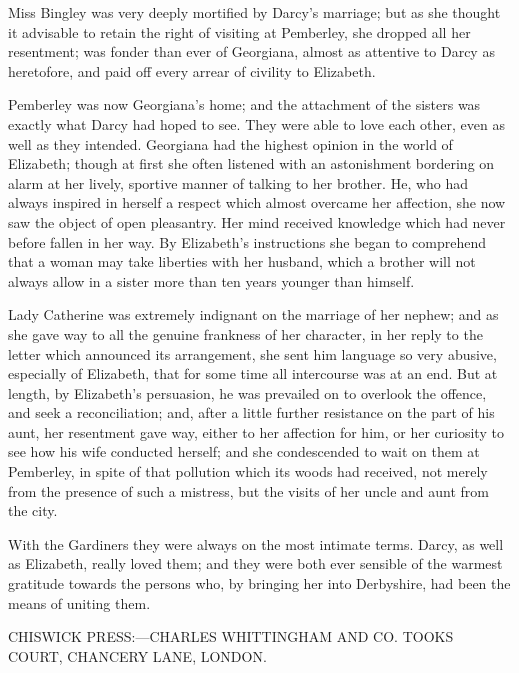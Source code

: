 \documentclass[12pt,openright]{book}
\begin{document}
Miss Bingley was very deeply mortified by Darcy’s marriage; but as she thought it advisable to retain the right of visiting at Pemberley, she dropped all her resentment; was fonder than ever of Georgiana, almost as attentive to Darcy as heretofore, and paid off every arrear of civility to Elizabeth.

Pemberley was now Georgiana’s home; and the attachment of the sisters was exactly what Darcy had hoped to see. They were able to love each other, even as well as they intended. Georgiana had the highest opinion in the world of Elizabeth; though at first she often listened with an astonishment bordering on alarm at her lively, sportive manner of talking to her brother. He, who had always inspired in herself a respect which almost overcame her affection, she now saw the object of open pleasantry. Her mind received knowledge which had never before fallen in her way. By Elizabeth’s instructions she began to comprehend that a woman may take liberties with her husband, which a brother will not always allow in a sister more than ten years younger than himself.

Lady Catherine was extremely indignant on the marriage of her nephew; and as she gave way to all the genuine frankness of her character, in her reply to the letter which announced its arrangement, she sent him language so very abusive, especially of Elizabeth, that for some time all intercourse was at an end. But at length, by Elizabeth’s persuasion, he was prevailed on to overlook the offence, and seek a reconciliation; and, after a little further resistance on the part of his aunt, her resentment gave way, either to her affection for him, or her curiosity to see how his wife conducted herself; and she condescended to wait on them at Pemberley, in spite of that pollution which its woods had received, not merely from the presence of such a mistress, but the visits of her uncle and aunt from the city.

With the Gardiners they were always on the most intimate terms. Darcy, as well as Elizabeth, really loved them; and they were both ever sensible of the warmest gratitude towards the persons who, by bringing her into Derbyshire, had been the means of uniting them.

CHISWICK PRESS:—CHARLES WHITTINGHAM AND CO.
TOOKS COURT, CHANCERY LANE, LONDON.
\end{document}
